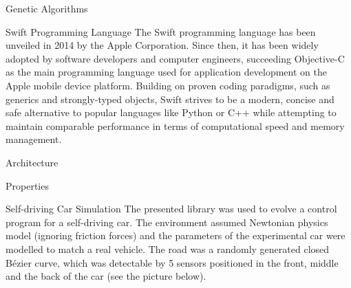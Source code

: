 \documentclass[a0paper,portrait]{baposter}
\begin{document}
\begin{poster}
\begin{posterbox}[name=intro-ga,column=0,below=objectives]{Genetic Algorithms}
\lipsum[2]
\end{posterbox}

\begin{posterbox}[name=intro-swift,column=0,below=intro-ga]{Swift Programming Language}
	The Swift programming language has been unveiled in 2014 by the Apple Corporation. Since then, it has been widely adopted by software developers and computer engineers, succeeding Objective-C as the main programming language used for application development on the Apple mobile device platform. Building on proven coding paradigms, such as generics and strongly-typed objects, Swift strives to be a modern, concise and safe alternative to popular languages like Python or C++ while attempting to maintain comparable performance in terms of computational speed and memory management.
\end{posterbox}

\begin{posterbox}[name=arch,column=1]{Architecture}
\end{posterbox}

\begin{posterbox}[name=props,column=1,below=arch]{Properties}
\end{posterbox}

\begin{posterbox}[name=car,column=1,below=props]{Self-driving Car Simulation}
	The presented library was used to evolve a control program for a self-driving car. The environment assumed Newtonian physics model (ignoring friction forces) and the parameters of the experimental car were modelled to match a real vehicle. The road was a randomly generated closed Bézier curve, which was detectable by 5 sensors positioned in the front, middle and the back of the car (see the picture below).

	\vspace{0.5em}


\end{posterbox}
\end{poster}
\end{document}
